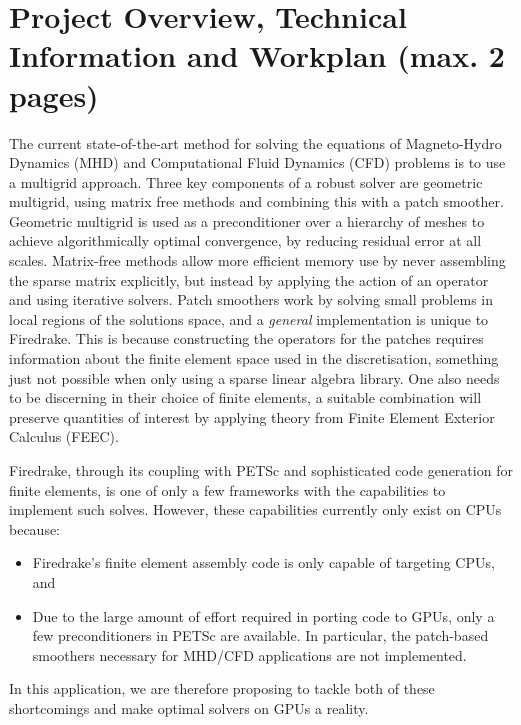 \documentclass[a4paper,11pt]{article}
\begin{document}
\section{Project Overview, Technical Information and Workplan (max. 2 pages)}
The current state-of-the-art method for solving the equations of Magneto-Hydro Dynamics (MHD) and Computational Fluid Dynamics (CFD) problems is to use a multigrid approach.
Three key components of a robust solver are geometric multigrid, using matrix free methods and combining this with a patch smoother.
Geometric multigrid is used as a preconditioner over a hierarchy of meshes to achieve algorithmically optimal convergence, by reducing residual error at all scales.
Matrix-free methods allow more efficient memory use by never assembling the sparse matrix explicitly, but instead by applying the action of an operator and using iterative solvers.
Patch smoothers work by solving small problems in local regions of the solutions space, and a \emph{general} implementation is unique to Firedrake.
This is because constructing the operators for the patches requires information about the finite element space used in the discretisation, something just not possible when only using a sparse linear algebra library.
One also needs to be discerning in their choice of finite elements, a suitable combination will preserve quantities of interest by applying theory from Finite Element Exterior Calculus (FEEC). 

Firedrake, through its coupling with PETSc and sophisticated code generation for finite elements, is one of only a few frameworks with the capabilities to implement such solves.
However, these capabilities currently only exist on CPUs because: 
\begin{itemize}
	\item Firedrake’s finite element assembly code is only capable of targeting CPUs, and
	\item Due to the large amount of effort required in porting code to GPUs, only a few preconditioners in PETSc are available. In particular, the patch-based smoothers necessary for MHD/CFD applications are not implemented.
\end{itemize}
In this application, we are therefore proposing to tackle both of these shortcomings and make optimal solvers on GPUs a reality. 
\end{document}
